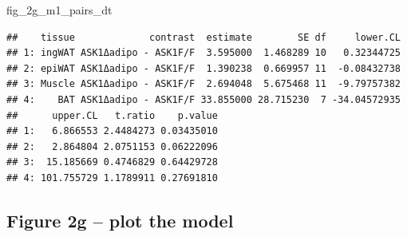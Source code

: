 \documentclass[]{book}
\newenvironment{Shaded}{\begin{snugshade}}{\end{snugshade}}
\newcommand{\NormalTok}[1]{#1}
\begin{document}
\begin{Shaded}
\begin{Highlighting}[]
\NormalTok{fig_2g_m1_pairs_dt}
\end{Highlighting}
\end{Shaded}

\begin{verbatim}
##    tissue             contrast  estimate        SE df     lower.CL
## 1: ingWAT ASK1Δadipo - ASK1F/F  3.595000  1.468289 10   0.32344725
## 2: epiWAT ASK1Δadipo - ASK1F/F  1.390238  0.669957 11  -0.08432738
## 3: Muscle ASK1Δadipo - ASK1F/F  2.694048  5.675468 11  -9.79757382
## 4:    BAT ASK1Δadipo - ASK1F/F 33.855000 28.715230  7 -34.04572935
##      upper.CL   t.ratio    p.value
## 1:   6.866553 2.4484273 0.03435010
## 2:   2.864804 2.0751153 0.06222096
## 3:  15.185669 0.4746829 0.64429728
## 4: 101.755729 1.1789911 0.27691810
\end{verbatim}

\hypertarget{figure-2g-plot-the-model}{%
\subsection{Figure 2g -- plot the model}\label{figure-2g-plot-the-model}}
\end{document}
